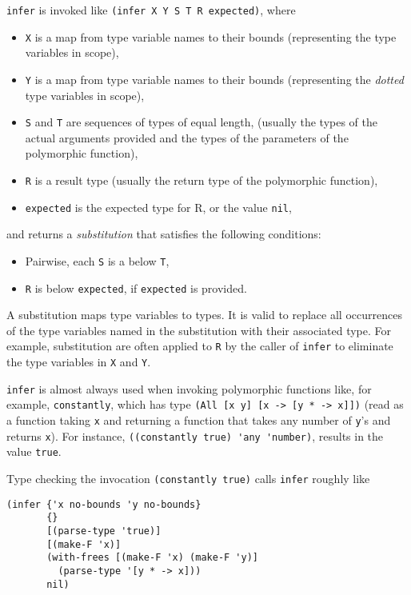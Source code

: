 \lstinline|infer| is invoked like \lstinline|(infer X Y S T R expected)|, where

\begin{itemize}
  \item \lstinline|X| is a map from type variable names
        to their bounds (representing the type variables in scope),
  \item \lstinline|Y| is a map from type variable names
        to their bounds (representing the \emph{dotted} type variables in scope),
  \item \lstinline|S| and \lstinline|T| are sequences of types of equal length,
        (usually the types of the actual arguments provided and the types of the parameters
        of the polymorphic function),
  \item \lstinline|R| is a result type (usually the return type of the polymorphic function),
  \item \lstinline|expected| is the expected type for R, or the value \lstinline|nil|,
\end{itemize}

and returns a \emph{substitution} that satisfies the following conditions:

\begin{itemize}
  \item Pairwise, each \lstinline|S| is a below \lstinline|T|,
  \item \lstinline|R| is below \lstinline|expected|, if \lstinline|expected| is provided.
\end{itemize}

A substitution maps type variables to types.
It is valid to replace all occurrences of the type variables named in the substitution 
with their associated type.
For example, substitution are often applied to \lstinline|R| by the caller of \lstinline|infer|
to eliminate the type variables in \lstinline|X| and \lstinline|Y|.

\lstinline|infer| is almost always used when invoking polymorphic functions like,
for example, \lstinline|constantly|, which has type \lstinline|(All [x y] [x -> [y * -> x]])|
(read as a function taking \lstinline|x| and returning a function that takes any number
of \lstinline|y|'s and returns \lstinline|x|).
For instance, \lstinline|((constantly true) 'any 'number)|, results in the value \lstinline|true|.

Type checking the invocation \lstinline|(constantly true)|
calls \lstinline|infer| roughly like

\begin{lstlisting}
(infer {'x no-bounds 'y no-bounds}
       {}
       [(parse-type 'true)]
       [(make-F 'x)]
       (with-frees [(make-F 'x) (make-F 'y)]
         (parse-type '[y * -> x]))
       nil)
\end{lstlisting}

